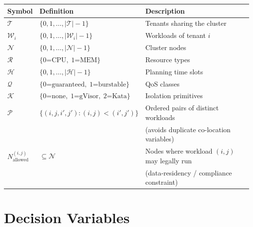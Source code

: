 \documentclass[11pt,a4paper]{article}
\newcommand{\cT}{\mathcal{T}}           %
\newcommand{\cW}{\mathcal{W}}           %
\newcommand{\cN}{\mathcal{N}}           %
\newcommand{\cR}{\mathcal{R}}           %
\newcommand{\cH}{\mathcal{H}}           %
\newcommand{\cQ}{\mathcal{Q}}           %
\newcommand{\cK}{\mathcal{K}}           %
\begin{document}
\begin{longtable}{@{}lll@{}}
  \toprule
  \textbf{Symbol} & \textbf{Definition} & \textbf{Description} \\
  \midrule
  \endhead
  $\cT$ & $\{0,1,\ldots,|\cT|-1\}$ & Tenants sharing the cluster \\
  $\cW_i$ & $\{0,1,\ldots,|\cW_i|-1\}$ & Workloads of tenant $i$ \\
  $\cN$ & $\{0,1,\ldots,|\cN|-1\}$ & Cluster nodes \\
  $\cR$ & $\{0\text{=CPU},\;1\text{=MEM}\}$ & Resource types \\
  $\cH$ & $\{0,1,\ldots,|\cH|-1\}$ & Planning time slots \\
  $\cQ$ & $\{0\text{=guaranteed},\;1\text{=burstable}\}$ & QoS classes \\
  $\cK$ & $\{0\text{=none},\;1\text{=gVisor},\;2\text{=Kata}\}$ & Isolation primitives \\[4pt]
  $\mathcal{P}$ & $\{(i,j,i',j') : (i,j)<(i',j')\}$ & Ordered pairs of distinct workloads \\
  & & (avoids duplicate co-location variables) \\
  $N_{\text{allowed}}^{(i,j)}$ & $\subseteq \cN$ & Nodes where workload $(i,j)$ may legally run \\
  & & (data-residency / compliance constraint) \\
  \bottomrule
\end{longtable}

\section{Decision Variables}
\end{document}
